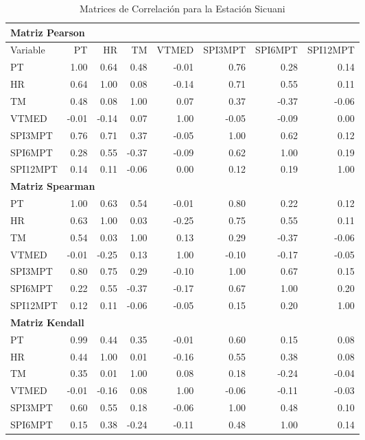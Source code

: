 \begin{table}[ht]
\centering
\caption{Matrices de Correlación para la Estación Sicuani}
\begin{tabular}{lrrrrrrr}
\toprule
\multicolumn{8}{l}{\textbf{Matriz Pearson}} \\
\midrule
Variable & PT & HR & TM & VTMED & SPI3MPT & SPI6MPT & SPI12MPT \\
\midrule
PT       & 1.00 & 0.64 & 0.48 & -0.01 & 0.76 & 0.28 & 0.14 \\
HR       & 0.64 & 1.00 & 0.08 & -0.14 & 0.71 & 0.55 & 0.11 \\
TM       & 0.48 & 0.08 & 1.00 & 0.07 & 0.37 & -0.37 & -0.06 \\
VTMED    & -0.01 & -0.14 & 0.07 & 1.00 & -0.05 & -0.09 & 0.00 \\
SPI3MPT  & 0.76 & 0.71 & 0.37 & -0.05 & 1.00 & 0.62 & 0.12 \\
SPI6MPT  & 0.28 & 0.55 & -0.37 & -0.09 & 0.62 & 1.00 & 0.19 \\
SPI12MPT & 0.14 & 0.11 & -0.06 & 0.00 & 0.12 & 0.19 & 1.00 \\
\midrule
\multicolumn{8}{l}{\textbf{Matriz Spearman}} \\
\midrule
PT       & 1.00 & 0.63 & 0.54 & -0.01 & 0.80 & 0.22 & 0.12 \\
HR       & 0.63 & 1.00 & 0.03 & -0.25 & 0.75 & 0.55 & 0.11 \\
TM       & 0.54 & 0.03 & 1.00 & 0.13 & 0.29 & -0.37 & -0.06 \\
VTMED    & -0.01 & -0.25 & 0.13 & 1.00 & -0.10 & -0.17 & -0.05 \\
SPI3MPT  & 0.80 & 0.75 & 0.29 & -0.10 & 1.00 & 0.67 & 0.15 \\
SPI6MPT  & 0.22 & 0.55 & -0.37 & -0.17 & 0.67 & 1.00 & 0.20 \\
SPI12MPT & 0.12 & 0.11 & -0.06 & -0.05 & 0.15 & 0.20 & 1.00 \\
\midrule
\multicolumn{8}{l}{\textbf{Matriz Kendall}} \\
\midrule
PT       & 0.99 & 0.44 & 0.35 & -0.01 & 0.60 & 0.15 & 0.08 \\
HR       & 0.44 & 1.00 & 0.01 & -0.16 & 0.55 & 0.38 & 0.08 \\
TM       & 0.35 & 0.01 & 1.00 & 0.08 & 0.18 & -0.24 & -0.04 \\
VTMED    & -0.01 & -0.16 & 0.08 & 1.00 & -0.06 & -0.11 & -0.03 \\
SPI3MPT  & 0.60 & 0.55 & 0.18 & -0.06 & 1.00 & 0.48 & 0.10 \\
SPI6MPT  & 0.15 & 0.38 & -0.24 & -0.11 & 0.48 & 1.00 & 0.14 \\

\end{tabular}
\end{table}
